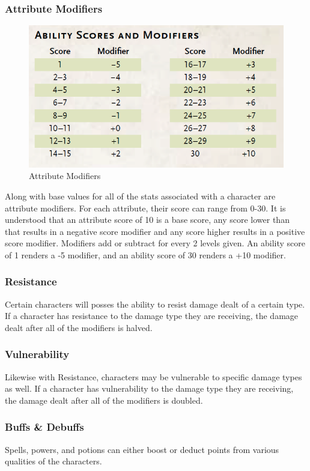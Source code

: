 \documentclass[12pt,a4paper]{report}
\begin{document}
		\subsubsection{Attribute Modifiers}
			\begin{figure}
				\includegraphics[scale=0.3]{modifier}
				\caption{Attribute Modifiers}
				\label{fig: Attribute Modifiers}
			\end{figure}
			Along with base values for all of the stats associated with a character are attribute modifiers. For each attribute, their score can range from 0-30. It is understood that an attribute score of 10 is a base score, any score lower than that results in a negative score modifier and any score higher results in a positive score modifier. Modifiers add or subtract for every 2 levels given. An ability score of 1 renders a -5 modifier, and an ability score of 30 renders a +10 modifier.
		\subsubsection{Resistance}
			Certain characters will posses the ability to resist damage dealt of a certain type. If a character has resistance to the damage type they are receiving, the damage dealt after all of the modifiers is halved.
		\subsubsection{Vulnerability}
			Likewise with Resistance, characters may be vulnerable to specific damage types as well. If a character has vulnerability to the damage type they are receiving, the damage dealt after all of the modifiers is doubled.
		\subsubsection{Buffs \& Debuffs}
			Spells, powers, and potions can either boost or deduct points from various qualities of the characters. 
		
\end{document}
